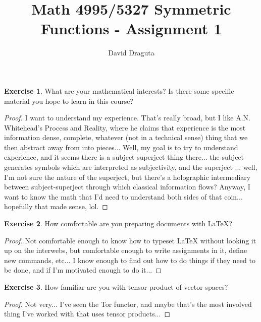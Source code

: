 \documentclass[12pt]{extarticle}
\title{ Math 4995/5327 Symmetric Functions - Assignment 1}
\author{David Draguta}
\newcommand{\<}{\langle}
\renewcommand{\>}{\rangle}
\theoremstyle{definition}
\newtheorem{exercise}{Exercise}
\begin{document}
\maketitle

\begin{exercise}
  What are your mathematical interests? Is there some specific material you hope to learn in this course?
\end{exercise}
\begin{proof}
  I want to understand my experience. That's really broad, but I like A.N. Whitehead's Process and Reality, where he claims that experience is the most information dense, complete, whatever (not in a technical sense) thing that we then abstract away from into pieces... Well, my goal is to try to understand experience, and it seems there is a subject-superject thing there... the subject generates symbols which are interpreted as subjectivity, and the superject ... well, I'm not sure the nature of the superject, but there's a holographic intermediary between subject-superject through which classical information flows? Anyway, I want to know the math that I'd need to understand both sides of that coin... hopefully that made sense, lol.
\end{proof}

\begin{exercise}
  How comfortable are you preparing documents with LaTeX?
\end{exercise}
\begin{proof}
  Not comfortable enough to know how to typeset LaTeX without looking it up on the interwebs, but comfortable enough to write assignments in it, define new commands, etc... I know enough to find out how to do things if they need to be done, and if I'm motivated enough to do it...
\end{proof}

\begin{exercise}
  How familiar are you with tensor product of vector spaces?
\end{exercise}

\begin{proof}
  Not very... I've seen the Tor functor, and maybe that's the most involved thing I've worked with that uses tensor products... 
\end{proof}
\end{document}

